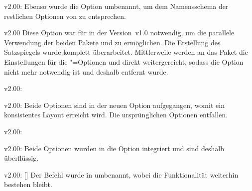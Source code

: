 \begin{Obsolete}{v2.00:}{}
\printobsoletelist%
%
Ebenso wurde die Option  umbenannt, um dem Namensschema der 
restlichen Optionen von \TUDScript zu entsprechen.
\end{Obsolete}

\begin{Obsolete}{v2.00}{}{%
}
\printobsoletelist%
%
Diese Option war für \TUDScript in der Version~v1.0 notwendig, um die parallele 
Verwendung der beiden Pakete  und  zu 
ermöglichen. Die Erstellung des Satzspiegels wurde komplett überarbeitet. 
Mittlerweile werden an das Paket  die Einstellungen für die 
\KOMAScript"=Optionen  und  direkt 
weitergereicht, sodass die Option  nicht mehr notwendig ist 
und deshalb entfernt wurde.
\end{Obsolete}

\begin{Obsolete}{v2.00:}{%
}
\begin{Obsolete}{v2.00:}{%
}
\printobsoletelist%
%
Beide Optionen sind in der neuen Option  
aufgegangen, womit ein konsistentes Layout erreicht wird. Die ursprünglichen 
Optionen entfallen. 
\end{Obsolete}
\end{Obsolete}

\begin{Obsolete}{v2.00:}{}
\begin{Obsolete}{v2.00:}{}
\printobsoletelist%
%
Beide Optionen wurden in die Option  integriert und sind 
deshalb überflüssig.
\end{Obsolete}
\end{Obsolete}

\begin{Obsolete}{v2.00:}{%
  []%
}
\printobsoletelist%
%
Der Befehl  wurde in  umbenannt, wobei die 
Funktionalität weiterhin bestehen bleibt.
\end{Obsolete}

